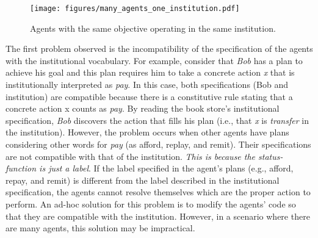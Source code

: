 \documentclass[runningheads]{llncs}
\begin{document}
\begin{figure*}[!ht]\centering %
	\texttt{[image: figures/many\_agents\_one\_institution.pdf]}
	\caption{Agents with the same objective operating in the same institution.}
	\label{fig:many_agents_one_institution}
\end{figure*}


The first problem observed is the incompatibility of the specification of the agents with the institutional vocabulary. 
For example, consider that \emph{Bob} has a plan to achieve his goal and this plan requires him to take a concrete action \emph{x} that is institutionally interpreted as \emph{pay}. In this case, both specifications (Bob and institution) are compatible because there is a constitutive rule %
stating that a concrete action x counts as \emph{pay}.
By reading the book store's institutional specification, \emph{Bob} discovers the action that fills his plan (i.e., that \emph{x} is \emph{transfer} in the institution).
However, the problem occurs when other agents have plans considering other words for \emph{pay} (as afford, replay, and remit). Their specifications are not compatible with that of the institution.
\textit{This is because the status-function is just a label}. If the label specified in the agent's plans (e.g., afford, repay, and remit) is different from the label described in the institutional specification, the agents cannot resolve themselves which are the proper action to perform.
An ad-hoc solution for this problem is to modify the agents' code so that they are compatible with the institution. However, in a scenario where there are many agents, this solution may be impractical.
\end{document}
